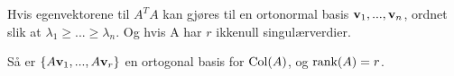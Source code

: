 Hvis egenvektorene til $A^TA$ kan gjøres til en
ortonormal basis $\mathbf{v}_1,...,\mathbf{v}_n$,
ordnet slik at $\lambda_1 \geq ... \geq \lambda_n$.
Og hvis A har $r$ ikkenull singulærverdier.

Så er $\{ A\mathbf{v}_1, ..., A\mathbf{v}_r \}$
en ortogonal basis for $\text{Col}(A)$, og $\text{rank}(A)=r$.
